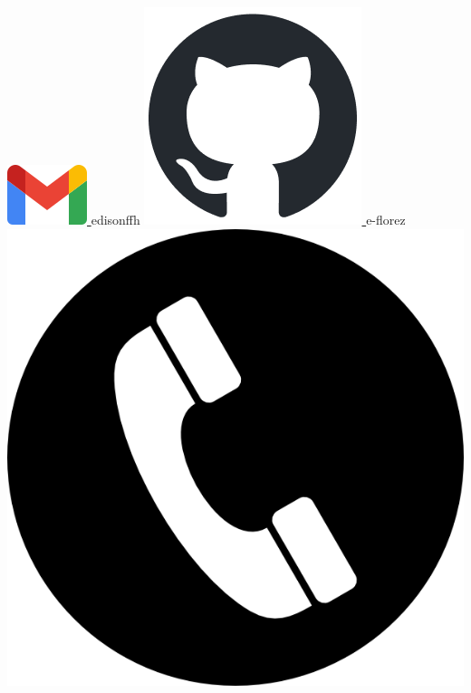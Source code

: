 \begin{center}
    \href{mailto:edisonffh@gmail.com}{
        \includegraphics[scale=0.25]{figs/gmail_icon.png}
    } edisonffh
    \hspace*{5mm}
    \href{https://github.com/e-florez}{
        \includegraphics[scale=0.3]{figs/github-mark.png}
    } e-florez
    \hspace*{5mm}
    \includegraphics[scale=0.3]{figs/phone.png}

\end{center}
